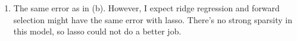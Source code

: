 \documentclass{article}
\begin{document}
\begin{enumerate}
\begin{enumerate}
\item The same error as in (b). However, I expect ridge regression and forward selection might have the same error with lasso. There's no strong sparsity in this model, so lasso could not do a better job.

\end{enumerate}

\end{enumerate}
\end{document}
